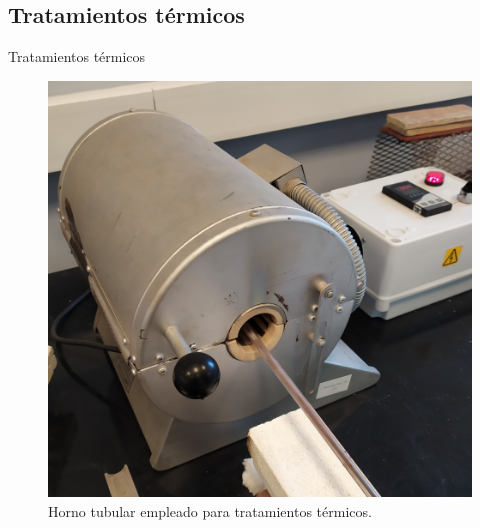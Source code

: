 \documentclass[11pt]{beamer}
\begin{document}
	\subsection{Tratamientos térmicos}
		\begin{frame}{Tratamientos térmicos}
			\begin{figure}
				\centering
				\includegraphics[scale=0.3]{img/hornito.png}
				\caption*{Horno tubular empleado para tratamientos térmicos.}				
			\end{figure}
		\end{frame}
	
\end{document}
